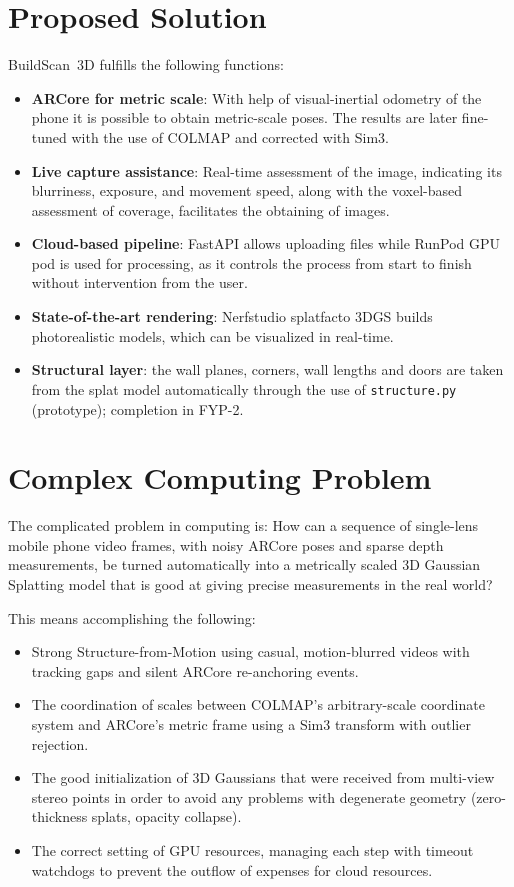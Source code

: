 \section{Proposed Solution}
BuildScan~3D fulfills the following functions:
\begin{itemize}
    \item \textbf{ARCore for metric scale}: With help of visual-inertial odometry of the phone it is possible to obtain metric-scale poses. The results are later fine-tuned with the use of COLMAP and corrected with Sim3.
    \item \textbf{Live capture assistance}: Real-time assessment of the image, indicating its blurriness, exposure, and movement speed, along with the voxel-based assessment of coverage, facilitates the obtaining of images.
    \item \textbf{Cloud-based pipeline}: FastAPI allows uploading files while RunPod GPU pod is used for processing, as it controls the process from start to finish without intervention from the user.
    \item \textbf{State-of-the-art rendering}: Nerfstudio splatfacto 3DGS builds photorealistic models, which can be visualized in real-time.
    \item \textbf{Structural layer}: the wall planes, corners, wall lengths and doors are taken from the splat model automatically through the use of \texttt{structure.py} (prototype); completion in FYP-2.
\end{itemize}

\section{Complex Computing Problem}
The complicated problem in computing is: How can a sequence of single-lens mobile phone video frames, with noisy ARCore poses and sparse depth measurements, be turned automatically into a metrically scaled 3D Gaussian Splatting model that is good at giving precise measurements in the real world?

This means accomplishing the following:
\begin{itemize}
    \item Strong Structure-from-Motion using casual, motion-blurred videos with tracking gaps and silent ARCore re-anchoring events.
    \item The coordination of scales between COLMAP's arbitrary-scale coordinate system and ARCore's metric frame using a Sim3 transform with outlier rejection.
    \item The good initialization of 3D Gaussians that were received from multi-view stereo points in order to avoid any problems with degenerate geometry (zero-thickness splats, opacity collapse).
    \item The correct setting of GPU resources, managing each step with timeout watchdogs to prevent the outflow of expenses for cloud resources.
\end{itemize}


